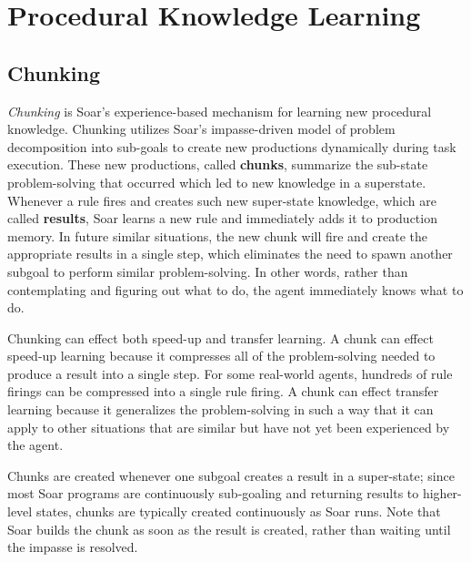 \chapter{Procedural Knowledge Learning}
\label{CHUNKING}

\section{Chunking}

\textit{Chunking} is Soar's experience-based mechanism for learning new procedural knowledge.  Chunking utilizes Soar's impasse-driven model of problem decomposition into sub-goals to create new productions dynamically during task execution.  These new productions, called \textbf{chunks}, summarize the sub-state problem-solving that occurred which led to new knowledge in a superstate.  Whenever a rule fires and creates such new super-state knowledge, which are called \textbf{results}, Soar learns a new rule and immediately adds it to production memory.  In future similar situations, the new chunk will fire and create the appropriate results in a single step, which eliminates the need to spawn another subgoal to perform similar problem-solving.  In other words, rather than contemplating and figuring out what to do, the agent immediately knows what to do.  

Chunking can effect both speed-up and transfer learning.  A chunk can effect speed-up learning because it compresses all of the problem-solving needed to produce a result into a single step.  For some real-world agents, hundreds of rule firings can be compressed into a single rule firing.  A chunk can effect transfer learning because it generalizes the problem-solving in such a way that it can apply to other situations that are similar but have not yet been experienced by the agent.

Chunks are created whenever one subgoal creates a result in a super-state; since most Soar programs are continuously sub-goaling and returning results to higher-level states, chunks are typically created continuously as Soar runs.  Note that Soar builds the chunk as soon as the result is created, rather than waiting until the impasse is resolved.


